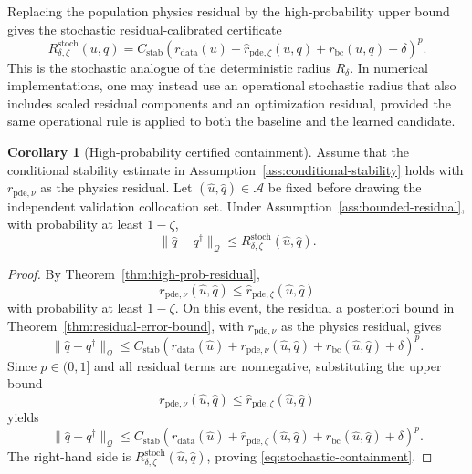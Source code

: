 \documentclass{article}
\numberwithin{equation}{section}
\theoremstyle{definition}
\newtheorem{corollary}{Corollary}
\begin{document}
Replacing the population physics residual by the high-probability upper bound gives the stochastic residual-calibrated certificate
\begin{equation}
R_{\delta,\zeta}^{\mathrm{stoch}}(u,q)
=
C_{\mathrm{stab}}
\left(
r_{\mathrm{data}}(u)
+
\widehat r_{\mathrm{pde},\zeta}(u,q)
+
r_{\mathrm{bc}}(u,q)
+
\delta
\right)^p .
\label{eq:stochastic-radius}
\end{equation}
This is the stochastic analogue of the deterministic radius \(R_\delta\). In numerical implementations, one may instead use an operational stochastic radius that also includes scaled residual components and an optimization residual, provided the same operational rule is applied to both the baseline and the learned candidate.

\begin{corollary}[High-probability certified containment]
\label{cor:stochastic-containment}
Assume that the conditional stability estimate in Assumption~\ref{ass:conditional-stability} holds with \(r_{\mathrm{pde},\nu}\) as the physics residual. Let \((\widehat u,\widehat q)\in\mathcal A\) be fixed before drawing the independent validation collocation set. Under Assumption~\ref{ass:bounded-residual}, with probability at least \(1-\zeta\),
\begin{equation}
\|\widehat q-q^\dagger\|_{\mathcal Q}
\le
R_{\delta,\zeta}^{\mathrm{stoch}}(\widehat u,\widehat q).
\label{eq:stochastic-containment}
\end{equation}
\end{corollary}

\begin{proof}
By Theorem~\ref{thm:high-prob-residual},
\[
r_{\mathrm{pde},\nu}(\widehat u,\widehat q)
\le
\widehat r_{\mathrm{pde},\zeta}(\widehat u,\widehat q)
\]
with probability at least \(1-\zeta\). On this event, the residual a posteriori bound in Theorem~\ref{thm:residual-error-bound}, with \(r_{\mathrm{pde},\nu}\) as the physics residual, gives
\[
\|\widehat q-q^\dagger\|_{\mathcal Q}
\le
C_{\mathrm{stab}}
\left(
r_{\mathrm{data}}(\widehat u)
+
r_{\mathrm{pde},\nu}(\widehat u,\widehat q)
+
r_{\mathrm{bc}}(\widehat u,\widehat q)
+
\delta
\right)^p .
\]
Since \(p\in(0,1]\) and all residual terms are nonnegative, substituting the upper bound
\[
r_{\mathrm{pde},\nu}(\widehat u,\widehat q)
\le
\widehat r_{\mathrm{pde},\zeta}(\widehat u,\widehat q)
\]
yields
\[
\|\widehat q-q^\dagger\|_{\mathcal Q}
\le
C_{\mathrm{stab}}
\left(
r_{\mathrm{data}}(\widehat u)
+
\widehat r_{\mathrm{pde},\zeta}(\widehat u,\widehat q)
+
r_{\mathrm{bc}}(\widehat u,\widehat q)
+
\delta
\right)^p .
\]
The right-hand side is \(R_{\delta,\zeta}^{\mathrm{stoch}}(\widehat u,\widehat q)\), proving \eqref{eq:stochastic-containment}.
\end{proof}
\end{document}
